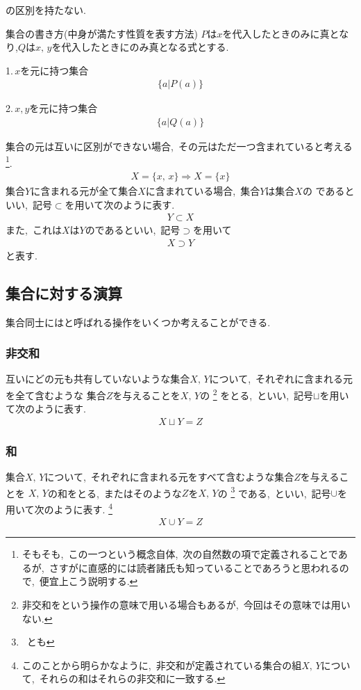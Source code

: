 \documentclass[hyperref,a4paper,12pt]{kininaruki}
\begin{document}
の区別を持たない.
\newpage
\begin{itembox}[l]{集合の書き方(中身が満たす性質を表す方法)}
    $P$は$x$を代入したときのみに真となり,$Q$は$x,\, y$を代入したときにのみ真となる式とする.


    1.\,$x$を元に持つ集合
    \begin{align}
        \{a|P(a)\}
    \end{align}

    2.\,$x,y$を元に持つ集合
    \begin{align}
        \{a|Q(a)\}
    \end{align}
\end{itembox}

集合の元は互いに区別ができない場合,\, その元はただ一つ含まれていると考える\footnote{そもそも,\, 
この一つという概念自体,\, 次の自然数の項で定義されることであるが,\, 
さすがに直感的には読者諸氏も知っていることであろうと思われるので,\, 便宜上こう説明する.}.
\begin{align}
    X = \{x,\, x\} \Rightarrow X = \{x\}
\end{align}
集合$Y$に含まれる元が全て集合$X$に含まれている場合,\, 集合$Y$は集合$X$の
であるといい,\, 
記号$\subset$を用いて次のように表す.
\begin{align}
    Y \subset X
\end{align}
また,\, これは$X$は$Y$のであるといい,\, 記号$\supset$を用いて
\begin{align}
    X \supset Y
\end{align}
と表す.
\newpage
\subsection{集合に対する演算}
集合同士にはと呼ばれる操作をいくつか考えることができる.
\subsubsection{非交和}
互いにどの元も共有していないような集合$X,\, Y$について,\, それぞれに含まれる元を全て含むような
集合$Z$を与えることを$X,\, Y$の
\footnote{非交和をという操作の意味で用いる場合もあるが,\, 今回はその意味では用いない.}
をとる,\, といい,\, 記号$\sqcup$を用いて次のように表す.
\begin{align}
    X \sqcup Y = Z
\end{align}
\emptyline
\subsubsection{和}
集合$X,\, Y$について,\, それぞれに含まれる元をすべて含むような集合$Z$を与えることを
$X,\, Y$の和をとる,\, またはそのような$Z$を$X,\, Y$の
\footnote{\, とも}
である,\, といい,\, 記号$\cup$を用いて次のように表す.
\footnote{このことから明らかなように,\, 非交和が定義されている集合の組$X,\, Y$について,\, 
それらの和はそれらの非交和に一致する.}
\begin{align}
    X \cup Y = Z
\end{align}
\end{document}

